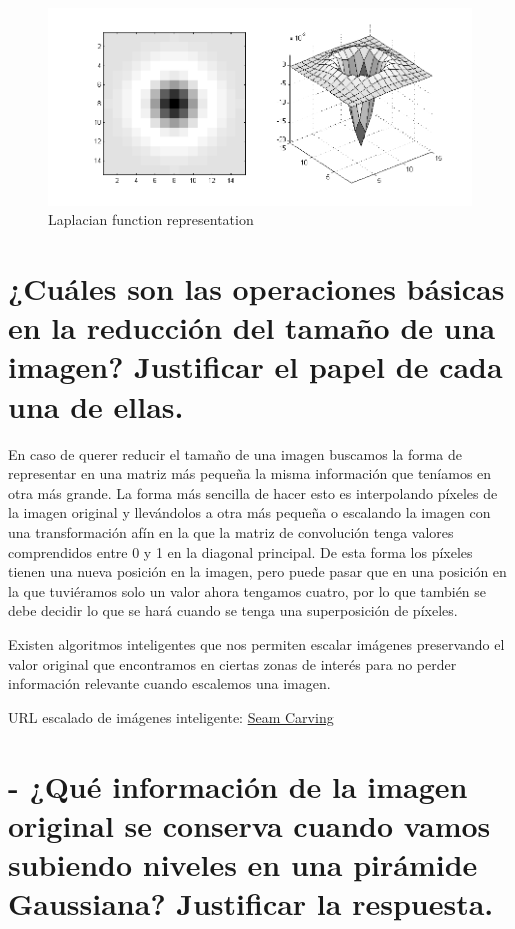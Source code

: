 \documentclass{article}
\begin{document}
\begin{figure}[h]
\vspace{0.5cm}
\centering
\includegraphics[scale=0.6]{laplac.png}
\caption{Laplacian function representation}	
\end{figure}



\section{¿Cuáles son las operaciones básicas en la reducción del tamaño de una imagen? Justificar el papel de cada una de ellas. }
En caso de querer reducir el tamaño de una imagen buscamos la forma de representar en una matriz más pequeña la misma información que teníamos en otra más grande. La forma más sencilla de hacer esto es interpolando píxeles de la imagen original y llevándolos a otra más pequeña o escalando la imagen con una transformación afín en la que la matriz de convolución tenga valores comprendidos entre 0 y 1 en la diagonal principal. De esta forma los píxeles tienen una nueva posición en la imagen, pero puede pasar que en una posición en la que tuviéramos solo un valor ahora tengamos cuatro, por lo que también se debe decidir lo que se hará cuando se tenga una superposición de píxeles.

Existen algoritmos inteligentes que nos permiten escalar imágenes preservando el valor original que encontramos en ciertas zonas de interés para no perder información relevante cuando escalemos una imagen.

URL escalado de imágenes inteligente: \href{http://nparashuram.com/seamcarving/}{Seam Carving}

\section{- ¿Qué información de la imagen original se conserva cuando vamos subiendo niveles en una pirámide Gaussiana? Justificar la respuesta. }
\end{document}
